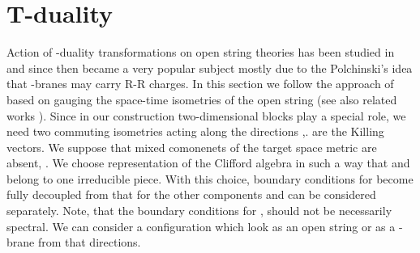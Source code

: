 \documentclass[a4paper,12pt,twoside]{article}
\begin{document}
\section{T-duality}
Action of \coordHE{}-duality transformations on open string theories
has been studied in 
\cite{Dai:1989ua,Leigh:1989jq,Horava:1989ga,Green:1991et}
and since then became a very popular
subject mostly due to the Polchinski's idea \cite{Polchinski:1995mt}  
that \coordHE{}-branes may carry R-R charges.
In this section we follow the approach of \cite{Alvarez:1996up}
based on gauging the space-time isometries of the open
string (see also related works \cite{Dorn:1996an,Forste:1996hy}).
Since in our construction two-dimensional blocks play a special
role, we need two commuting isometries acting along the directions
\coordHE{} ,\coordHE{}. 
\coordHE{} are the Killing vectors. We suppose that mixed comonenets
of the target space metric are absent, \coordHE{}.
We choose representation of the Clifford
algebra in such a way that \coordHE{} and \coordHE{} belong to one irreducible
piece. With this choice, boundary conditions for \coordHE{}
become fully decoupled from that for the other components
and can be considered separately. Note, that the boundary conditions
for \coordHE{}, \coordHE{} should not be necessarily spectral.
We can consider a configuration which look as an open
string or as a \coordHE{}-brane from that directions.
 
\end{document}

